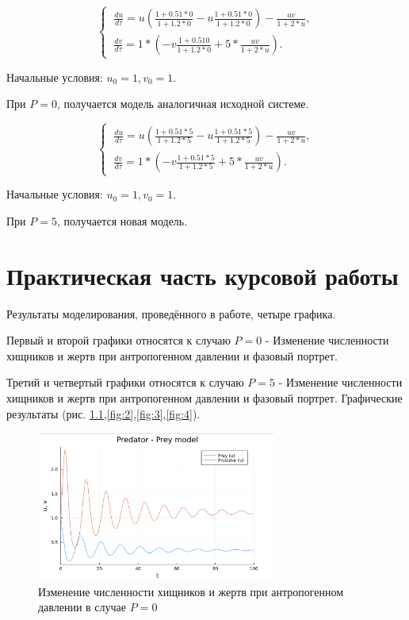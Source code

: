 \documentclass[
  13pt,
  fontsize=13pt,
  russian,
  a4paper,
,captions=tableheading
]{scrreprt}
\begin{document}
\[
\begin{cases}
\ \frac{du}{d\tau}=u(\frac{1+0.51*0}{1+1.2*0}-u\frac{1+0.51*0}{1+1.2*0})-\frac{uv}{1+2*u},\\
\ \frac{dv}{d\tau}=1*(-v\frac{1+0.510}{1+1.2*0}+5* \frac{uv}{1+2*u}).
\end{cases}
\]

Начальные условия: \(u_{0}=1, v_{0}=1\).

При \(P=0\), получается модель аналогичная исходной системе.

\[
\begin{cases}
\ \frac{du}{d\tau}=u(\frac{1+0.51*5}{1+1.2*5}-u\frac{1+0.51*5}{1+1.2*5})-\frac{uv}{1+2*u},\\
\ \frac{dv}{d\tau}=1*(-v\frac{1+0.51*5}{1+1.2*5}+5* \frac{uv}{1+2*u}).
\end{cases}
\]

Начальные условия: \(u_{0}=1, v_{0}=1\).

При \(P=5\), получается новая модель.

\hypertarget{ux43fux440ux430ux43aux442ux438ux447ux435ux441ux43aux430ux44f-ux447ux430ux441ux442ux44c-ux43aux443ux440ux441ux43eux432ux43eux439-ux440ux430ux431ux43eux442ux44b}{%
\chapter{Практическая часть курсовой
работы}\label{ux43fux440ux430ux43aux442ux438ux447ux435ux441ux43aux430ux44f-ux447ux430ux441ux442ux44c-ux43aux443ux440ux441ux43eux432ux43eux439-ux440ux430ux431ux43eux442ux44b}}

Результаты моделирования, проведённого в работе, четыре графика.

Первый и второй графики относятся к случаю \(P=0\) - Изменение
численности хищников и жертв при антропогенном давлении и фазовый
портрет.

Третий и четвертый графики относятся к случаю \(P=5\) - Изменение
численности хищников и жертв при антропогенном давлении и фазовый
портрет. Графические результаты (рис.
\ref{fig:1},\ref{fig:2},\ref{fig:3},\ref{fig:4}).

\begin{figure}
\hypertarget{fig:1}{%
\centering
\includegraphics[width=0.7\textwidth,height=\textheight]{1.png}
\caption{Изменение численности хищников и жертв при антропогенном
давлении в случае \(P=0\)}\label{fig:1}
}
\end{figure}
\end{document}

